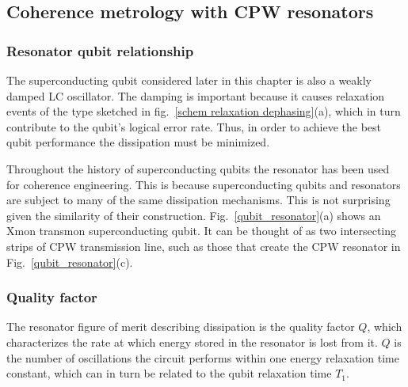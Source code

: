 
\subsection{Coherence metrology with CPW resonators}

\subsubsection{Resonator qubit relationship}

The superconducting qubit considered later in this chapter is also a weakly damped LC oscillator.
The damping is important because it causes relaxation events of the type sketched in fig.~\ref{schem relaxation dephasing}(a),
which in turn contribute to the qubit's logical error rate.
Thus, in order to achieve the best qubit performance the dissipation must be minimized.

Throughout the history of superconducting qubits the resonator has been used for coherence engineering.
This is because superconducting qubits and resonators are subject to many of the same dissipation mechanisms.
This is not surprising given the similarity of their construction.
Fig.~\ref{qubit_resonator}(a) shows an Xmon transmon superconducting qubit.
It can be thought of as two intersecting strips of CPW transmission line,
such as those that create the CPW resonator in Fig.~\ref{qubit_resonator}(c).


\subsubsection{Quality factor}
The resonator figure of merit describing dissipation is the quality factor $Q$,
which characterizes the rate at which energy stored in the resonator is lost from it.  $Q$ is the number of oscillations
the circuit performs within one energy relaxation time constant, which can in turn be related to the qubit relaxation time $T_1$.


